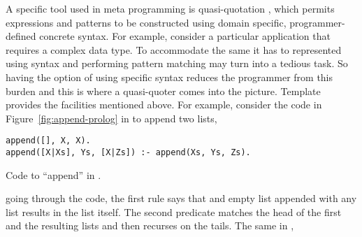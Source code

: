 \documentclass[thesis-solanki.tex]{subfiles}
\begin{document}
A specific tool used in meta programming is quasi-quotation
\cite{mainland2007s,haskellquasi,wikiquasi},
which permits
 expressions and patterns to be constructed using domain specific, pro\-gram\-mer-de\-fined concrete
syntax.
For example, consider a particular application that requires a complex data type.
To accommodate the same it has to represented using  syntax and performing
pattern matching may
turn into a tedious task.
So having the option of using specific syntax reduces the programmer from this burden and this is where a
quasi-quoter comes into the picture.
Template  provides the facilities mentioned above.
For example, consider the code in Figure~\ref{fig:append-prolog}
in  to append two lists,
\begin{code-list}[h]
\begin{verbatim}
append([], X, X).
append([X|Xs], Ys, [X|Zs]) :- append(Xs, Ys, Zs).
\end{verbatim}    
\vspace*{-0.8\baselineskip}
\caption{Code to ``append'' in \protect{}.}
\label{fig:append-prolog}
\end{code-list}
going through the code, the first rule says that and empty list appended with any list results in the list itself.
The second predicate matches the head of the first and the resulting
lists and then recurses on the tails. 
The same in ,
\inputminted[linenos]{haskell}{append.pl}
\end{document}
